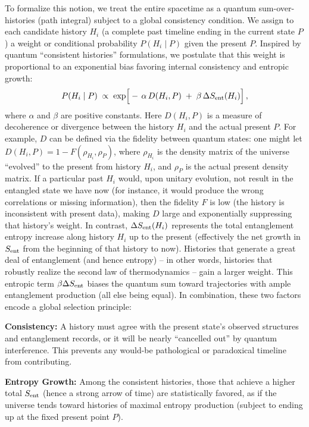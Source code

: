 \documentclass[11pt]{article}
\begin{document}
To formalize this notion, we treat the entire spacetime as a quantum sum-over-histories (path integral) subject to a global consistency condition. We assign to each candidate history $H_i$ (a complete past timeline ending in the current state $P$) a weight or conditional probability $P(H_i \mid P)$ given the present $P$. Inspired by quantum “consistent histories” formulations, we postulate that this weight is proportional to an exponential bias favoring internal consistency and entropic growth:
\begin{equation*}
P(H_i \mid P) \;\propto\; \exp\!\Big[-\,\alpha\,D(H_i, P)\;+\;\beta\,\Delta S_{\rm ent}(H_i)\Big]\,,
\end{equation*}
where $\alpha$ and $\beta$ are positive constants. Here $D(H_i, P)$ is a measure of decoherence or divergence between the history $H_i$ and the actual present $P$. For example, $D$ can be defined via the fidelity between quantum states: one might let $D(H_i,P) = 1 - F(\rho_{H_i}, \rho_P)$, where $\rho_{H_i}$ is the density matrix of the universe “evolved” to the present from history $H_i$, and $\rho_P$ is the actual present density matrix. If a particular past $H_i$ would, upon unitary evolution, not result in the entangled state we have now (for instance, it would produce the wrong correlations or missing information), then the fidelity $F$ is low (the history is inconsistent with present data), making $D$ large and exponentially suppressing that history’s weight. In contrast, $\Delta S_{\rm ent}(H_i)$ represents the total entanglement entropy increase along history $H_i$ up to the present (effectively the net growth in $S_{\rm ent}$ from the beginning of that history to now). Histories that generate a great deal of entanglement (and hence entropy) – in other words, histories that robustly realize the second law of thermodynamics – gain a larger weight. This entropic term $\beta \Delta S_{\rm ent}$ biases the quantum sum toward trajectories with ample entanglement production (all else being equal). In combination, these two factors encode a global selection principle:

\textbf{Consistency:} A history must agree with the present state’s observed structures and entanglement records, or it will be nearly “cancelled out” by quantum interference. This prevents any would-be pathological or paradoxical timeline from contributing.

\textbf{Entropy Growth:} Among the consistent histories, those that achieve a higher total $S_{\rm ent}$ (hence a strong arrow of time) are statistically favored, as if the universe tends toward histories of maximal entropy production (subject to ending up at the fixed present point $P$).
\end{document}

